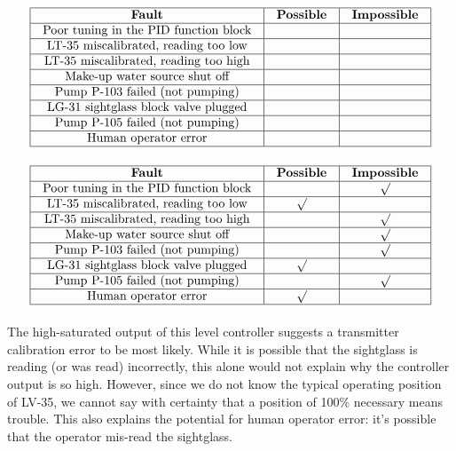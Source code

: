 $$\vbox{\offinterlineskip
\halign{\strut
\vrule \quad\hfil # \ \hfil & 
\vrule \quad\hfil # \ \hfil & 
\vrule \quad\hfil # \ \hfil \vrule \cr
\noalign{\hrule}
%
{\bf Fault} & {\bf Possible} & {\bf Impossible} \cr
%
\noalign{\hrule}
%
Poor tuning in the PID function block &  &  \cr
%
\noalign{\hrule}
%
LT-35 miscalibrated, reading too low &  &  \cr
%
\noalign{\hrule}
%
LT-35 miscalibrated, reading too high &  &  \cr
%
\noalign{\hrule}
%
Make-up water source shut off &  &  \cr
%
\noalign{\hrule}
%
Pump P-103 failed (not pumping) &  &  \cr
%
\noalign{\hrule}
%
LG-31 sightglass block valve plugged &  &  \cr
%
\noalign{\hrule}
%
Pump P-105 failed (not pumping) &  &  \cr
%
\noalign{\hrule}
%
Human operator error &  &  \cr
%
\noalign{\hrule}
} %
}$$ %
















$$\vbox{\offinterlineskip
\halign{\strut
\vrule \quad\hfil # \ \hfil & 
\vrule \quad\hfil # \ \hfil & 
\vrule \quad\hfil # \ \hfil \vrule \cr
\noalign{\hrule}
%
{\bf Fault} & {\bf Possible} & {\bf Impossible} \cr
%
\noalign{\hrule}
%
Poor tuning in the PID function block &  & $\surd$ \cr
%
\noalign{\hrule}
%
LT-35 miscalibrated, reading too low & $\surd$ &  \cr
%
\noalign{\hrule}
%
LT-35 miscalibrated, reading too high &  & $\surd$ \cr
%
\noalign{\hrule}
%
Make-up water source shut off &  & $\surd$ \cr
%
\noalign{\hrule}
%
Pump P-103 failed (not pumping) &  & $\surd$ \cr
%
\noalign{\hrule}
%
LG-31 sightglass block valve plugged & $\surd$ &  \cr
%
\noalign{\hrule}
%
Pump P-105 failed (not pumping) &  & $\surd$ \cr
%
\noalign{\hrule}
%
Human operator error & $\surd$ &  \cr
%
\noalign{\hrule}
} %
}$$ %


The high-saturated output of this level controller suggests a transmitter calibration error to be most likely.  While it is possible that the sightglass is reading (or was read) incorrectly, this alone would not explain why the controller output is so high.  However, since we do not know the typical operating position of LV-35, we cannot say with certainty that a position of 100\% necessary means trouble.  This also explains the potential for human operator error: it's possible that the operator mis-read the sightglass.











